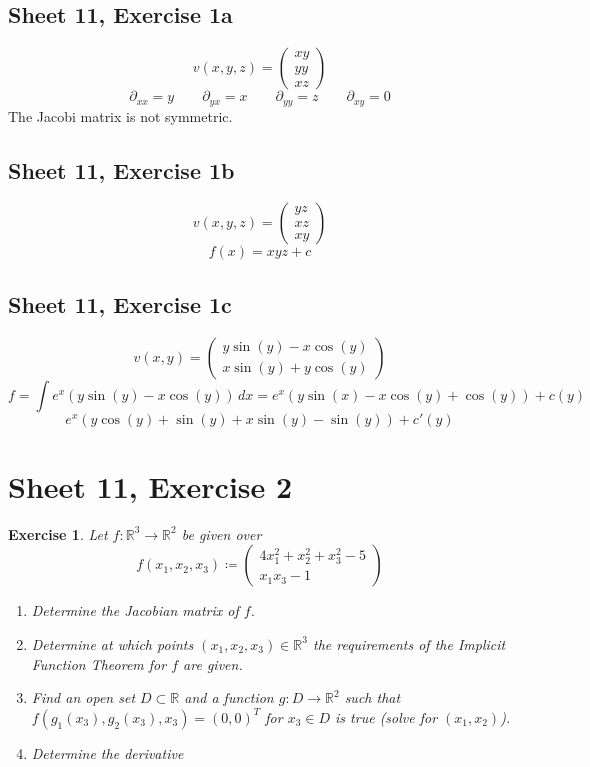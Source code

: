 \documentclass{article}
\newtheorem{ex}{Exercise} %
\begin{document}
\subsection{Sheet 11, Exercise 1a}

\[ v(x, y, z) = \begin{pmatrix} xy \\ yy \\ xz \end{pmatrix} \]
\[ \partial_{xx} = y \qquad \partial_{yx} = x \qquad \partial_{yy} = z \qquad \partial_{xy} = 0 \]
The Jacobi matrix is not symmetric.

\subsection{Sheet 11, Exercise 1b}

\[ v(x, y, z) = \begin{pmatrix} yz \\ xz \\ xy \end{pmatrix} \]
\[ f(x) = xyz + c \]

\subsection{Sheet 11, Exercise 1c}

\[ v(x, y) = \begin{pmatrix} y \sin(y) - x \cos(y) \\ x \sin(y) + y \cos(y) \end{pmatrix} \]
\[ f = \int e^x (y \sin(y) - x \cos(y)) \, dx = e^x (y \sin(x) - x \cos(y) + \cos(y)) + c(y) \]
\[ e^x (y \cos(y) + \sin(y) + x \sin(y) - \sin(y)) + c'(y) \]

\section{Sheet 11, Exercise 2}
\begin{ex}
  Let $f: \mathbb R^3 \to \mathbb R^2$ be given over
  \[
    f(x_1, x_2, x_3) \coloneqq \begin{pmatrix}
      4x_1^2 + x_2^2 + x_3^2 - 5 \\
      x_1 x_3 - 1
    \end{pmatrix}
  \]
  \begin{enumerate}
    \item Determine the Jacobian matrix of $f$.
    \item Determine at which points $(x_1, x_2, x_3) \in \mathbb R^3$ the requirements of the Implicit Function Theorem for $f$ are given.
    \item Find an open set $D \subset \mathbb R$ and a function $g: D \to \mathbb R^2$ such that $f(g_1(x_3), g_2(x_3), x_3) = (0, 0)^T$ for $x_3 \in D$ is true (solve for $(x_1, x_2)$).
    \item Determine the derivative
  \end{enumerate}
\end{ex}
\end{document}

